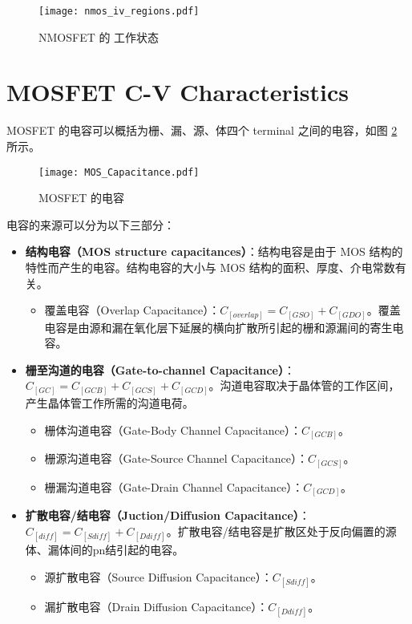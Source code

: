 \begin{figure}[!hbt]
    \centering
    \texttt{[image: nmos\_iv\_regions.pdf]}
    \caption{NMOSFET 的 工作状态}
    \label{fig:nmos_iv_regions}
\end{figure}

\section{MOSFET C-V Characteristics}

MOSFET 的电容可以概括为栅、漏、源、体四个 terminal 之间的电容，如图 \ref{fig:mosfet_capacitance} 所示。

\begin{figure}[!htb]
    \centering
    \texttt{[image: MOS\_Capacitance.pdf]}
    \caption{MOSFET 的电容\cite{CMOS-VLSI}}
    \label{fig:mosfet_capacitance}
\end{figure}

电容的来源可以分为以下三部分：
\begin{itemize}
    \item \textbf{结构电容（MOS structure capacitances）}：结构电容是由于 MOS 结构的特性而产生的电容。结构电容的大小与 MOS 结构的面积、厚度、介电常数有关。
    \begin{itemize}
        \item 覆盖电容（Overlap Capacitance）：$C_[overlap] = C_[GSO] + C_[GDO]$。覆盖电容是由源和漏在氧化层下延展的横向扩散所引起的栅和源漏间的寄生电容。
    \end{itemize}
    \item \textbf{栅至沟道的电容（Gate-to-channel Capacitance）}：$C_[GC] = C_[GCB] + C_[GCS] + C_[GCD]$。沟道电容取决于晶体管的工作区间，产生晶体管工作所需的沟道电荷。
    \begin{itemize}
        \item 栅体沟道电容（Gate-Body Channel Capacitance）：$C_[GCB]$。
        \item 栅源沟道电容（Gate-Source Channel Capacitance）：$C_[GCS]$。
        \item 栅漏沟道电容（Gate-Drain Channel Capacitance）：$C_[GCD]$。
    \end{itemize}
    \item \textbf{扩散电容/结电容（Juction/Diffusion Capacitance）}：$C_[diff] = C_[Sdiff] + C_[Ddiff]$。扩散电容/结电容是扩散区处于反向偏置的源体、漏体间的pn结引起的电容。
    \begin{itemize}
        \item 源扩散电容（Source Diffusion Capacitance）：$C_[Sdiff]$。
        \item 漏扩散电容（Drain Diffusion Capacitance）：$C_[Ddiff]$。
    \end{itemize}
\end{itemize}

